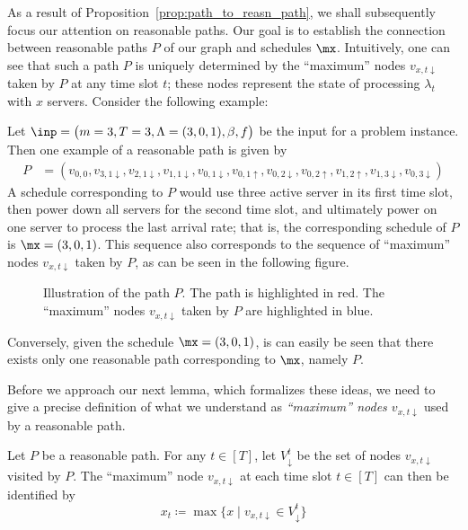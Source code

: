 As a result of Proposition~\ref{prop:path_to_reasn_path}, we shall subsequently focus our attention on reasonable paths. Our goal is to establish the connection between reasonable paths $P$ of our graph and schedules $\mx$. Intuitively, one can see that such a path $P$ is uniquely determined by the ``maximum'' nodes $v_{x,t\downarrow}$ taken by $P$ at any time slot $t$; these nodes represent the state of processing $\lambda_t$ with $x$ servers. Consider the following example:
\begin{exmpl}
Let $\inp=\bigl(m=3,T=3,\Lambda=(3,0,1),\beta,f\bigr)$ be the input for a problem instance. Then one example of a reasonable path is given by
\begin{align*}
	P&=(v_{0,0},v_{3,1\downarrow},v_{2,1\downarrow},v_{1,1\downarrow},v_{0,1\downarrow},v_{0,1\uparrow},v_{0,2\downarrow},v_{0,2\uparrow},v_{1,2\uparrow},v_{1,3\downarrow},v_{0,3\downarrow})
\end{align*}
A schedule corresponding to $P$ would use three active server in its first time slot, then power down all servers for the second time slot, and ultimately power on one server to process the last arrival rate; that is, the corresponding schedule of $P$ is $\mx=(3,0,1)$. This sequence also corresponds to the sequence of ``maximum'' nodes $v_{x,t\downarrow}$ taken by $P$, as can be seen in the following figure.
\begin{figure}[H]

\caption{Illustration of the path $P$. The path is highlighted in red. The ``maximum'' nodes $v_{x,t\downarrow}$ taken by $P$ are highlighted in blue.}
\end{figure}
Conversely, given the schedule $\mx=(3,0,1)$, is can easily be seen that there exists only one reasonable path corresponding to $\mx$, namely $P$.
\end{exmpl}
Before we approach our next lemma, which formalizes these ideas, we need to give a precise definition of what we understand as \emph{``maximum'' nodes $v_{x,t\downarrow}$} used by a reasonable path.
\begin{defn}\label{defn:max_path_node}
Let $P$ be a reasonable path. For any $t\in[T]$, let $V_\downarrow^t$ be the set of nodes $v_{x,t\downarrow}$ visited by $P$. The ``maximum'' node $v_{x,t\downarrow}$ at each time slot $t\in[T]$ can then be identified by
\begin{equation*}
	x_t\coloneqq\max\bigl\{x\mid v_{x,t\downarrow}\in V_\downarrow^t\bigr\}
\end{equation*}
\end{defn}
